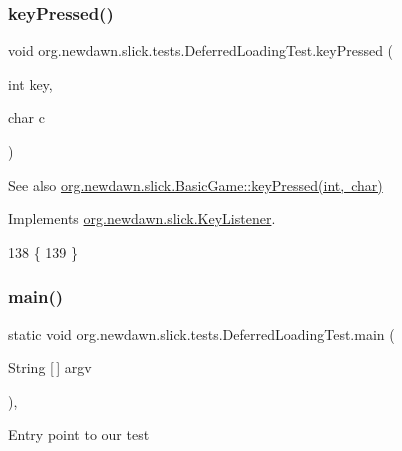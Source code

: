 \subsubsection{\texorpdfstring{key\+Pressed()}{keyPressed()}}
{\footnotesize\ttfamily void org.\+newdawn.\+slick.\+tests.\+Deferred\+Loading\+Test.\+key\+Pressed (\begin{DoxyParamCaption}\item[{int}]{key,  }\item[{char}]{c }\end{DoxyParamCaption})\hspace{0.3cm}{\ttfamily [inline]}}

\begin{DoxySeeAlso}{See also}
\mbox{\hyperlink{classorg_1_1newdawn_1_1slick_1_1_basic_game_a4fbb3345b5abf5ddd54a99466d07f02f}{org.\+newdawn.\+slick.\+Basic\+Game\+::key\+Pressed(int, char)}} 
\end{DoxySeeAlso}


Implements \mbox{\hyperlink{interfaceorg_1_1newdawn_1_1slick_1_1_key_listener_ac0b0568a21ef486c4f51382614c196ef}{org.\+newdawn.\+slick.\+Key\+Listener}}.


\begin{DoxyCode}
138                                             \{
139     \}
\end{DoxyCode}
\mbox{\label{classorg_1_1newdawn_1_1slick_1_1tests_1_1_deferred_loading_test_af6d4a365f606666656f28290663b3260}} 
\subsubsection{\texorpdfstring{main()}{main()}}
{\footnotesize\ttfamily static void org.\+newdawn.\+slick.\+tests.\+Deferred\+Loading\+Test.\+main (\begin{DoxyParamCaption}\item[{String \mbox{[}$\,$\mbox{]}}]{argv }\end{DoxyParamCaption})\hspace{0.3cm}{\ttfamily [inline]}, {\ttfamily [static]}}

Entry point to our test


